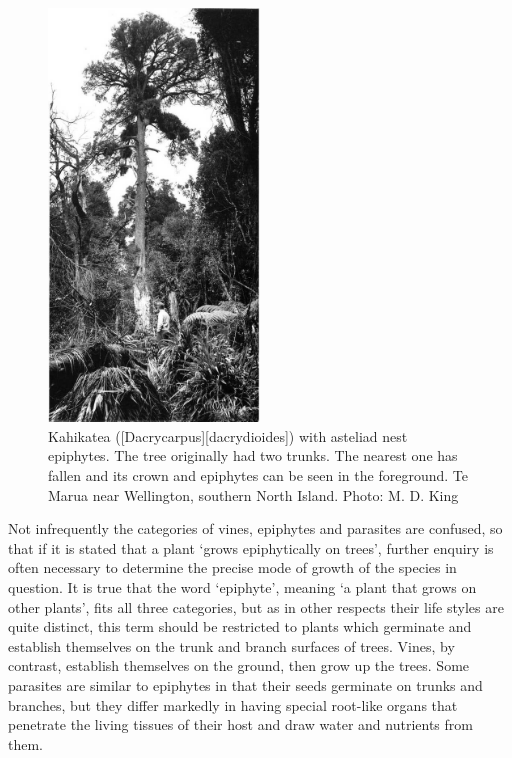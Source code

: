 \begin{figure}
	\includegraphics[width=0.5\textwidth]{graphics/figure26kahikatea.jpg}
	\centering
	\caption[Kahikatea with asteliad nest epiphytes]{Kahikatea ([Dacrycarpus][dacrydioides]) with asteliad nest epiphytes.
	The tree originally had two trunks.
	The nearest one has fallen and its crown and epiphytes can be seen in the foreground.
	Te Marua near Wellington, southern North Island.
	Photo: M. D. King}%
	\label{fig:26kahikatea}
\end{figure}

Not infrequently the categories of vines, epiphytes and parasites are confused, so that if it is stated that a plant `grows epiphytically on trees', further enquiry is often necessary to determine the precise mode of growth of the species in question.
It is true that the word `epiphyte', meaning `a plant that grows on other plants', fits all three categories, but as in other respects their life styles are quite distinct, this term should be restricted to plants which germinate and establish themselves on the trunk and branch surfaces of trees.
Vines, by contrast, establish themselves on the ground, then grow up the trees.
Some parasites are similar to epiphytes in that their seeds germinate on trunks and branches, but they differ markedly in having special root-like organs that penetrate the living tissues of their host and draw water and nutrients from them.

